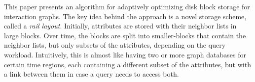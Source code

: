 This paper presents an algorithm for adaptively optimizing disk block storage
for interaction graphs. The key idea behind the approach is a novel storage
scheme, called a \emph{rail layout}.  Initially, attributes are stored with
their neighbor lists in large blocks. Over time, the blocks are split into
smaller-blocks that contain the neighbor lists, but only subsets of the
attributes, depending on the query workload. Intuitively, this is almost like
having two or more graph databases for certain time regions, each containing a
different subset of the attributes, but with a link between them in case a
query needs to access both.





